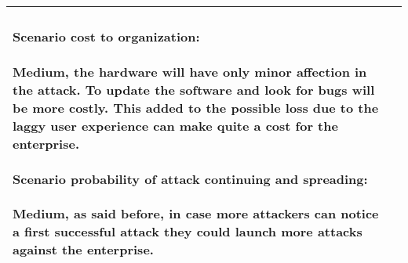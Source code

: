 \begin{longtable}{| p{4cm} | p{8cm} |}
{		\paragraph{Scenario cost to organization:}Medium, the hardware will have only minor affection in the attack. To update the software and look for bugs will be more costly. This added to the possible loss due to the laggy user experience can make quite a cost for the enterprise.
		\paragraph{Scenario probability of attack continuing and spreading:}Medium, as said before, in case more attackers can notice a first successful attack they could launch more attacks against the enterprise.
	}\\\hline
	
\end{longtable}